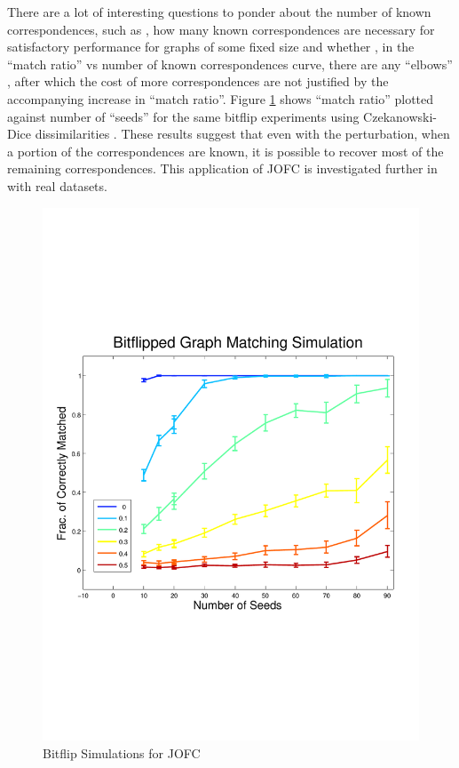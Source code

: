\documentclass[11pt]{article} %
\begin{document}
There are a lot  of interesting questions to ponder about the number of known correspondences, such as , how many known correspondences are necessary for satisfactory performance for graphs of some fixed size and whether , in the ``match ratio'' vs number of known correspondences curve,  there are any ``elbows'' , after which the cost of more correspondences are not justified by the accompanying increase in ``match ratio''. Figure \ref{bitflipJOFC} shows ``match ratio'' plotted against number of ``seeds'' for the same bitflip experiments using  Czekanowski-Dice dissimilarities . These results suggest that even with the perturbation, when a portion of the correspondences are known, it is possible to recover most of the remaining correspondences. This application of JOFC is  investigated further in \cite{SGMviaJOFC} with real datasets.
\begin{figure}
\includegraphics{bitflip_JOFC}
\caption{Bitflip Simulations for JOFC \label{bitflipJOFC}}
\end{figure}
\end{document}
